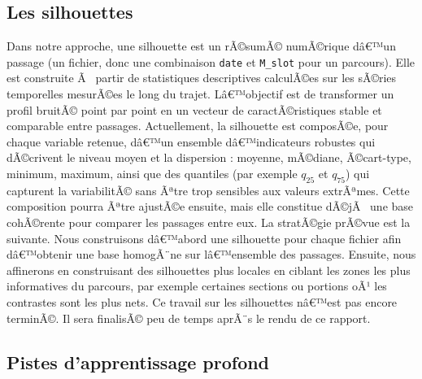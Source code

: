 \documentclass{article}
\begin{document}
\subsection{Les silhouettes}

Dans notre approche, une silhouette est un rÃ©sumÃ© numÃ©rique dâ€™un passage (un fichier, donc une combinaison \texttt{date} et \texttt{M\_slot} pour un parcours). Elle est construite Ã  partir de statistiques descriptives calculÃ©es sur les sÃ©ries temporelles mesurÃ©es le long du trajet. Lâ€™objectif est de transformer un profil bruitÃ© point par point en un vecteur de caractÃ©ristiques stable et comparable entre passages.
Actuellement, la silhouette est composÃ©e, pour chaque variable retenue, dâ€™un ensemble dâ€™indicateurs robustes qui dÃ©crivent le niveau moyen et la dispersion :
moyenne, mÃ©diane, Ã©cart-type, minimum, maximum, ainsi que des quantiles (par exemple $q_{25}$ et $q_{75}$) qui capturent la variabilitÃ© sans Ãªtre trop sensibles aux valeurs extrÃªmes. Cette composition pourra Ãªtre ajustÃ©e ensuite, mais elle constitue dÃ©jÃ  une base cohÃ©rente pour comparer les passages entre eux.
La stratÃ©gie prÃ©vue est la suivante. Nous construisons dâ€™abord une silhouette pour chaque fichier afin dâ€™obtenir une base homogÃ¨ne sur lâ€™ensemble des passages. Ensuite, nous affinerons en construisant des silhouettes plus locales en ciblant les zones les plus informatives du parcours, par exemple certaines sections ou portions oÃ¹ les contrastes sont les plus nets. Ce travail sur les silhouettes nâ€™est pas encore terminÃ©. Il sera finalisÃ© peu de temps aprÃ¨s le rendu de ce rapport.

\subsection{Pistes d'apprentissage profond}
\label{sec:dl_pistes}
\end{document}
